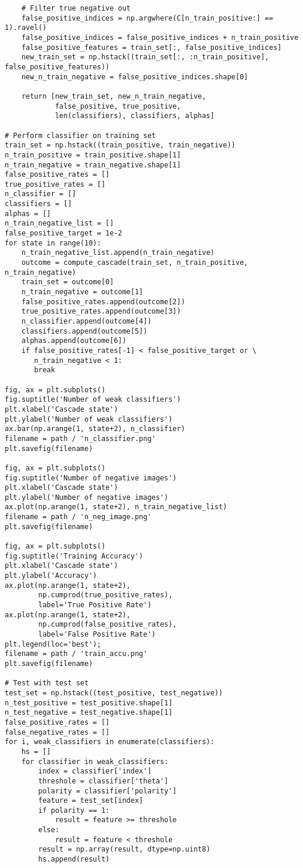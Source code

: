 \documentclass[11pt]{article}
\begin{document}
\begin{lstlisting}
    # Filter true negative out
    false_positive_indices = np.argwhere(C[n_train_positive:] == 1).ravel() 
    false_positive_indices = false_positive_indices + n_train_positive
    false_positive_features = train_set[:, false_positive_indices]
    new_train_set = np.hstack((train_set[:, :n_train_positive], false_positive_features))
    new_n_train_negative = false_positive_indices.shape[0]

    return [new_train_set, new_n_train_negative, 
            false_positive, true_positive, 
            len(classifiers), classifiers, alphas]

# Perform classifier on training set
train_set = np.hstack((train_positive, train_negative))
n_train_positive = train_positive.shape[1]
n_train_negative = train_negative.shape[1]
false_positive_rates = []
true_positive_rates = []
n_classifier = []
classifiers = []
alphas = []
n_train_negative_list = []
false_positive_target = 1e-2
for state in range(10):
    n_train_negative_list.append(n_train_negative)
    outcome = compute_cascade(train_set, n_train_positive, n_train_negative)
    train_set = outcome[0]
    n_train_negative = outcome[1]
    false_positive_rates.append(outcome[2])
    true_positive_rates.append(outcome[3])
    n_classifier.append(outcome[4])
    classifiers.append(outcome[5])
    alphas.append(outcome[6])
    if false_positive_rates[-1] < false_positive_target or \
       n_train_negative < 1:
       break

fig, ax = plt.subplots()
fig.suptitle('Number of weak classifiers')
plt.xlabel('Cascade state')
plt.ylabel('Number of weak classifiers')
ax.bar(np.arange(1, state+2), n_classifier)
filename = path / 'n_classifier.png'
plt.savefig(filename)

fig, ax = plt.subplots()
fig.suptitle('Number of negative images')
plt.xlabel('Cascade state')
plt.ylabel('Number of negative images')
ax.plot(np.arange(1, state+2), n_train_negative_list)
filename = path / 'n_neg_image.png'
plt.savefig(filename)

fig, ax = plt.subplots()
fig.suptitle('Training Accuracy')
plt.xlabel('Cascade state')
plt.ylabel('Accuracy')
ax.plot(np.arange(1, state+2), 
        np.cumprod(true_positive_rates), 
        label='True Positive Rate')
ax.plot(np.arange(1, state+2), 
        np.cumprod(false_positive_rates), 
        label='False Positive Rate')
plt.legend(loc='best');
filename = path / 'train_accu.png'
plt.savefig(filename)

# Test with test set
test_set = np.hstack((test_positive, test_negative))
n_test_positive = test_positive.shape[1]
n_test_negative = test_negative.shape[1]
false_positive_rates = []
false_negative_rates = []
for i, weak_classifiers in enumerate(classifiers):
    hs = []
    for classifier in weak_classifiers:
        index = classifier['index']
        threshole = classifier['theta']
        polarity = classifier['polarity']
        feature = test_set[index]
        if polarity == 1:
            result = feature >= threshole
        else:
            result = feature < threshole
        result = np.array(result, dtype=np.uint8)
        hs.append(result)
    

\end{lstlisting}
\end{document}
